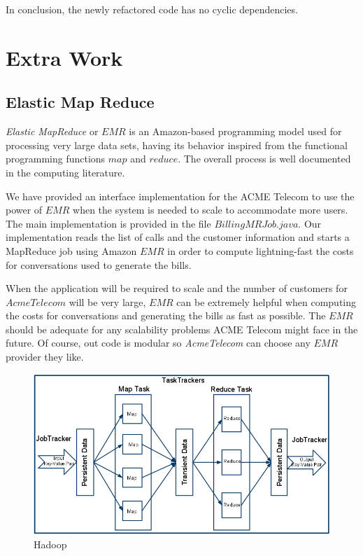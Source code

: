 \documentclass[11pt,twocolumn]{article} %
\begin{document}
In conclusion, the newly refactored code has no cyclic dependencies.

\section{Extra Work}
\subsection{Elastic Map Reduce}
\emph{Elastic MapReduce} or $EMR$ is an Amazon-based programming model used for processing very large data sets, 
having its behavior inspired from the functional programming functions $map$ and $reduce$. The overall process is well
documented in the computing literature.

We have provided an interface implementation for the ACME Telecom to use the power of $EMR$ when the system is needed to scale to 
accommodate more users. The main implementation is provided in the file $BillingMRJob.java$. Our implementation reads the list of calls and the 
customer information and starts a MapReduce job using Amazon $EMR$ in order to compute lightning-fast the costs for conversations used 
to generate the bills.

When the application will be required to scale and the number of customers for $AcmeTelecom$ will be very large, $EMR$ can be extremely 
helpful when computing the costs for conversations and generating the bills as fast as possible. The $EMR$ should be adequate for any 
scalability problems ACME Telecom might face in the future. Of course, out code is modular so \textit{AcmeTelecom} can choose any 
$EMR$ provider they like.

\begin{figure}[ht]
\includegraphics[scale=0.25]{hadoop.png}
\caption{Hadoop \cite{hadoop}}
\end{figure}
\end{document}
